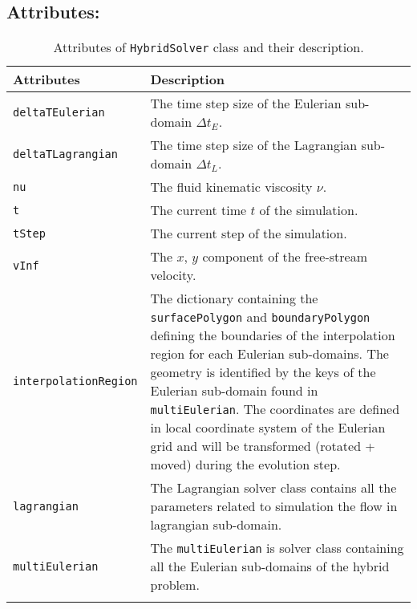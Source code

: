 \subsection*{Attributes:}
\begingroup
\footnotesize
\begin{longtable}{|l|p{10cm}|}
	\hline
	\textbf{Attributes} & \textbf{Description}\\
	\toprule
    \texttt{deltaTEulerian} 		& The time step size of the Eulerian sub-domain $\Delta t_E$. \\ \hline
    \texttt{deltaTLagrangian} 		& The time step size of the Lagrangian sub-domain $\Delta t_L$.\\ \hline
	\texttt{nu} 			& The fluid kinematic viscosity $\nu$.  \\ \hline        
    \texttt{t} 				& The current time $t$ of the simulation. \\ \hline                    
    \texttt{tStep} 			& The current step of the simulation. \\ \hline                    
    \texttt{vInf} 			& The $x$, $y$ component of the free-stream velocity. \\ \hline
    \texttt{interpolationRegion} & The dictionary containing the \texttt{surfacePolygon} and \texttt{boundaryPolygon} defining the boundaries of the interpolation region for each Eulerian sub-domains. The geometry is identified by the keys of the Eulerian sub-domain found in \texttt{multiEulerian}. The coordinates are defined in local coordinate system of the Eulerian grid and will be transformed (rotated + moved) during the evolution step. \\ \hline
    \texttt{lagrangian} 	& The Lagrangian solver class contains all the parameters related to simulation the flow in lagrangian sub-domain. \\ \hline
    \texttt{multiEulerian} 	& The \texttt{multiEulerian} is solver class containing all the Eulerian sub-domains of the hybrid problem. \\ \hline
    
    \caption{Attributes of \texttt{HybridSolver} class and their description.}
    \label{tab:attributeHybrid}
\end{longtable}
\endgroup


